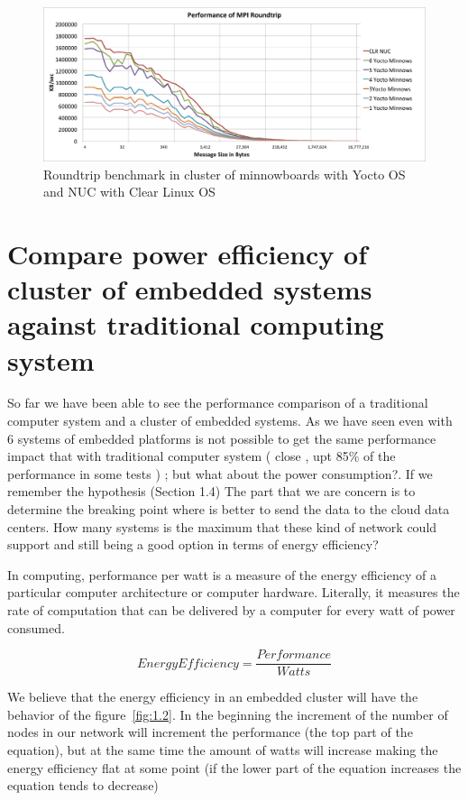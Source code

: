 \begin{figure}[H]
\centering
\includegraphics[width=1.0\textwidth]{images/mpbench_cluster_experiments/mpi_roundtrip.png}
\caption{Roundtrip  benchmark in cluster of minnowboards with Yocto OS and NUC
with Clear Linux OS}
\label{all_to_all_cluster}
\end{figure}



\section{Compare power efficiency of cluster of embedded systems against
traditional computing system}


So far we have been able to see the performance comparison of a traditional
computer system and a cluster of embedded systems. As we have seen even with 6
systems of embedded platforms is not possible to get the same performance
impact that with traditional computer system ( close , upt 85\% of the
performance in some tests ) ; but what about the power consumption?. If we
remember the hypothesis (Section 1.4) The part that we are concern is to
determine the breaking point where is better to send the data to the cloud data
centers. How many systems is the maximum that these kind of network could
support and still being a good option in terms of energy efficiency?

In computing, performance per watt is a measure of the energy efficiency of a
particular computer architecture or computer hardware. Literally, it measures
the rate of computation that can be delivered by a computer for every watt of
power consumed.

\begin{equation}
    Energy Efficiency = \dfrac {Performance}{Watts}
\end{equation}

We believe that the energy efficiency in an embedded cluster will have the
behavior of the  figure~\ref{fig:1.2}. In the beginning the increment of the
number of nodes in our network will increment the performance (the top part of
the equation), but at the same time the amount of watts will
increase making the energy efficiency flat at some point (if the lower part of
the equation increases the equation tends to decrease)

